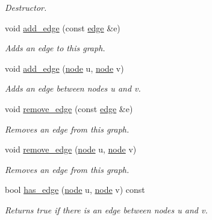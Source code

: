 \begin{DoxyCompactItemize}
\begin{DoxyCompactList}\small\item\em Destructor. \end{DoxyCompactList}\item 
void \hyperlink{classlgraph_1_1utils_1_1udgraph_a087b723d4be694711a82d66d8bd0164e}{add\+\_\+edge} (const \hyperlink{namespacelgraph_1_1utils_a6510284ce1b1ae5dc97ce5d2de426e10}{edge} \&e)
\begin{DoxyCompactList}\small\item\em Adds an edge to this graph. \end{DoxyCompactList}\item 
void \hyperlink{classlgraph_1_1utils_1_1udgraph_accf8897335f6cfce5e001c2907462226}{add\+\_\+edge} (\hyperlink{namespacelgraph_1_1utils_a7bd66ede3805ef121bc2835bd48de0cf}{node} u, \hyperlink{namespacelgraph_1_1utils_a7bd66ede3805ef121bc2835bd48de0cf}{node} v)
\begin{DoxyCompactList}\small\item\em Adds an edge between nodes {\itshape u} and {\itshape v}. \end{DoxyCompactList}\item 
void \hyperlink{classlgraph_1_1utils_1_1udgraph_ac5ba48d8bbd044a09ed9d84a881178cd}{remove\+\_\+edge} (const \hyperlink{namespacelgraph_1_1utils_a6510284ce1b1ae5dc97ce5d2de426e10}{edge} \&e)
\begin{DoxyCompactList}\small\item\em Removes an edge from this graph. \end{DoxyCompactList}\item 
void \hyperlink{classlgraph_1_1utils_1_1udgraph_ad414c0739a86b461af2c8160bca07f0b}{remove\+\_\+edge} (\hyperlink{namespacelgraph_1_1utils_a7bd66ede3805ef121bc2835bd48de0cf}{node} u, \hyperlink{namespacelgraph_1_1utils_a7bd66ede3805ef121bc2835bd48de0cf}{node} v)
\begin{DoxyCompactList}\small\item\em Removes an edge from this graph. \end{DoxyCompactList}\item 
bool \hyperlink{classlgraph_1_1utils_1_1udgraph_aebc98d234955028116978eff9c13445b}{has\+\_\+edge} (\hyperlink{namespacelgraph_1_1utils_a7bd66ede3805ef121bc2835bd48de0cf}{node} u, \hyperlink{namespacelgraph_1_1utils_a7bd66ede3805ef121bc2835bd48de0cf}{node} v) const 
\begin{DoxyCompactList}\small\item\em Returns true if there is an edge between nodes {\itshape u} and {\itshape v}. \end{DoxyCompactList}\item 

\end{DoxyCompactItemize}
